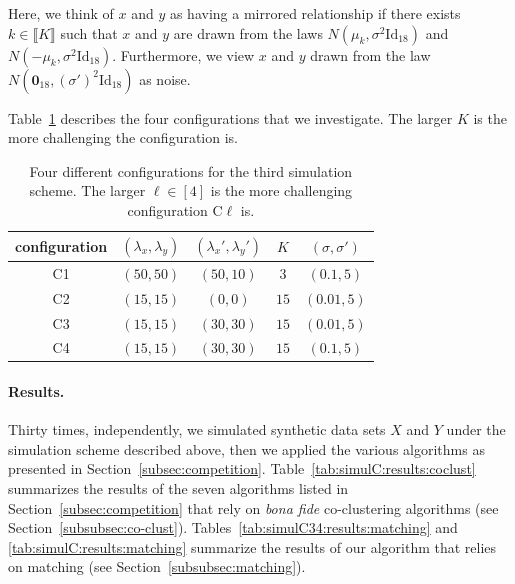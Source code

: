 Here, we  think of  $x$ and  $y$ as  having a  mirrored relationship  if there
exists  $k\in\llbracket K\rrbracket$   such  that   $x$  and   $y$  are   drawn  from   the  laws
$N(\mu_{k},             \sigma^{2}            \text{Id}_{18})$             and
$N(-\mu_{k}, \sigma^{2}  \text{Id}_{18})$.  Furthermore,  we view $x$  and $y$
drawn  from  the  law $N(\textbf{0}_{18},  (\sigma')^{2}  \text{Id}_{18})$  as
noise.

Table~\ref{tab:SS3} describes the four configurations that we investigate. The
larger $K$ is the more challenging the configuration is.

\begin{table}[!ht]
  \center
  \begin{tabular}{|c|c|c|c|c|}\hline
    configuration & $(\lambda_x, \lambda_y)$ & $(\lambda_x',\lambda_y')$ & $K$ & $(\sigma, \sigma')$\\ \hline
    C1 & $(50, 50)$ & $(50, 10)$ & $3 $&$(0.1, 5)$ \\
    C2&$ (15,15)$ &$(0,0)$&$15$&$(0.01,5)$\\
    C3 & $ (15, 15)$ & $(30, 30)$ &$ 15$& $(0.01, 5)$\\
    C4& $ (15, 15)$ & $(30, 30)$ &$ 15$&$(0.1, 5)$ \\
    \hline
  \end{tabular}
  \caption{Four different configurations for  the third simulation scheme. The
    larger  $\ell  \in [4]$  is  the  more challenging  configuration  C$\ell$
    is.}
  \label{tab:SS3}
\end{table}


\paragraph*{Results.}

Thirty  times, independently,  we simulated  synthetic data  sets $X$  and $Y$
under  the simulation  scheme described  above,  then we  applied the  various
algorithms      as     presented      in     Section~\ref{subsec:competition}.
Table~\ref{tab:simulC:results:coclust}  summarizes the  results  of the  seven
algorithms   listed   in   Section~\ref{subsec:competition}   that   rely   on
\textit{bona         fide}        co-clustering         algorithms        (see
Section~\ref{subsubsec:co-clust}).  Tables~\ref{tab:simulC34:results:matching}
and \ref{tab:simulC:results:matching}  summarize the results of  our algorithm
that relies on matching (see Section~\ref{subsubsec:matching}).

